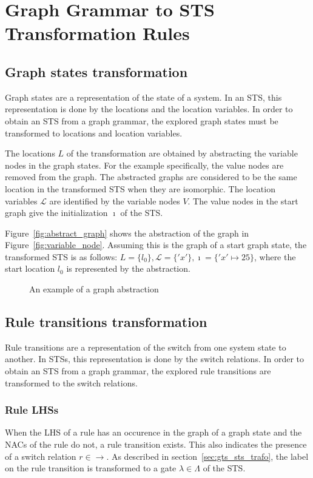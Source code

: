 \section{Graph Grammar to STS Transformation Rules}\label{sec:gg-to-sts}

\subsection{Graph states transformation}
Graph states are a representation of the state of a system. In an STS, this representation is done by the locations and the location variables. In order to obtain an STS from a graph grammar, the explored graph states must be transformed to locations and location variables. 

The locations $L$ of the transformation are obtained by abstracting the variable nodes in the graph states. For the example specifically, the value nodes are removed from the graph. The abstracted graphs are considered to be the same location in the transformed STS when they are isomorphic. The location variables $\mathcal{L}$ are identified by the variable nodes $V$. The value nodes in the start graph give the initialization $\imath$ of the STS.

Figure~\ref{fig:abstract_graph} shows the abstraction of the graph in Figure~\ref{fig:variable_node}. Assuming this is the graph of a start graph state, the transformed STS is as follows: $L = \{l_0\}, \mathcal{L} = \{'x'\}, \imath = \{'x' \mapsto 25\}$, where the start location $l_0$ is represented by the abstraction.

\begin{figure}[ht]
  \begin{center}
    
  \end{center}
  \caption{An example of a graph abstraction}
\end{figure}

\subsection{Rule transitions transformation}
Rule transitions are a representation of the switch from one system state to another. In STSs, this representation is done by the switch relations. In order to obtain an STS from a graph grammar, the explored rule transitions are transformed to the switch relations.

\subsubsection{Rule LHSs}\label{sec:rule_lhss}
When the LHS of a rule has an occurence in the graph of a graph state and the NACs of the rule do not, a rule transition exists. This also indicates the presence of a switch relation $r \in \rightarrow$. As described in section~\ref{sec:gts_sts_trafo}, the label on the rule transition is transformed to a gate $\lambda \in \Lambda$ of the STS.


